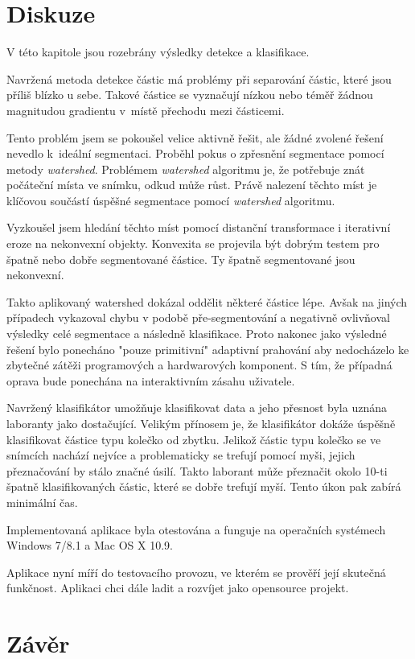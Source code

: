 \documentclass[11pt,twoside,a4paper,table]{book}
\begin{document}
\chapter{Diskuze}
V této kapitole jsou rozebrány výsledky detekce a klasifikace.

Navržená metoda detekce částic má problémy při separování částic, které jsou příliš blízko u sebe. Takové částice se vyznačují nízkou nebo téměř žádnou magnitudou gradientu v~místě přechodu mezi částicemi.

Tento problém jsem se pokoušel velice aktivně řešit, ale žádné zvolené řešení nevedlo k~ideální segmentaci. Proběhl pokus o zpřesnění segmentace pomocí metody \textit{watershed}. Problémem \textit{watershed} algoritmu je, že potřebuje znát počáteční místa ve snímku, odkud může růst. Právě nalezení těchto míst je klíčovou součástí úspěšné segmentace pomocí \textit{watershed} algoritmu.

Vyzkoušel jsem hledání těchto míst pomocí distanční transformace i iterativní eroze na nekonvexní objekty. Konvexita se projevila být dobrým testem pro špatně nebo dobře segmentované částice. Ty špatně segmentované jsou nekonvexní.

Takto aplikovaný watershed dokázal oddělit některé částice lépe. Avšak na jiných případech vykazoval chybu v podobě pře-segmentování a negativně ovlivňoval výsledky celé segmentace a následně klasifikace. Proto nakonec jako výsledné řešení bylo ponecháno "pouze primitivní" adaptivní prahování aby nedocházelo ke zbytečné zátěži programových a hardwarových komponent. S tím, že případná oprava bude ponechána na interaktivním zásahu uživatele.

Navržený klasifikátor umožňuje klasifikovat data a jeho přesnost byla uznána laboranty jako dostačující. Velikým přínosem je, že klasifikátor dokáže úspěšně klasifikovat částice typu kolečko od zbytku. Jelikož částic typu kolečko se ve snímcích nachází nejvíce a problematicky se trefují pomocí myši, jejich přeznačování by stálo značné úsilí. Takto laborant může přeznačit okolo 10-ti špatně klasifikovaných částic, které se dobře trefují myší. Tento úkon pak zabírá minimální čas.

Implementovaná aplikace byla otestována a funguje na operačních systémech Windows 7/8.1 a Mac OS X 10.9.

Aplikace nyní míří do testovacího provozu, ve kterém se prověří její skutečná funkčnost. Aplikaci chci dále ladit a rozvíjet jako opensource projekt.

\chapter{Závěr}
\end{document}
